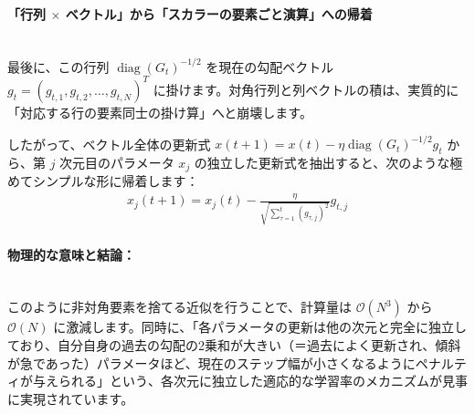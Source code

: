 \documentclass[dvipdfmx,a4paper,11pt]{jsarticle}
\begin{document}
\paragraph{「行列 $\times$ ベクトル」から「スカラーの要素ごと演算」への帰着}\ \\
最後に、この行列 $\operatorname{diag}(G_t)^{-1/2}$ を現在の勾配ベクトル $g_t = (g_{t,1}, g_{t,2}, \dots, g_{t,N})^T$ に掛けます。対角行列と列ベクトルの積は、実質的に「対応する行の要素同士の掛け算」へと崩壊します。
    
したがって、ベクトル全体の更新式 $x(t+1) = x(t) - \eta \operatorname{diag}(G_t)^{-1/2} g_t$ から、第 $j$ 次元目のパラメータ $x_j$ の独立した更新式を抽出すると、次のような極めてシンプルな形に帰着します：
\begin{align*}
    x_j(t+1) = x_j(t) - \frac{\eta}{\sqrt{\sum_{\tau=1}^t (g_{\tau,j})^2}} g_{t,j}
\end{align*}
\paragraph{物理的な意味と結論：}\ \\
このように非対角要素を捨てる近似を行うことで、計算量は $\mathcal{O}(N^3)$ から $\mathcal{O}(N)$ に激減します。同時に、「各パラメータの更新は他の次元と完全に独立しており、自分自身の過去の勾配の2乗和が大きい（＝過去によく更新され、傾斜が急であった）パラメータほど、現在のステップ幅が小さくなるようにペナルティが与えられる」という、各次元に独立した適応的な学習率のメカニズムが見事に実現されています。
\end{document}
